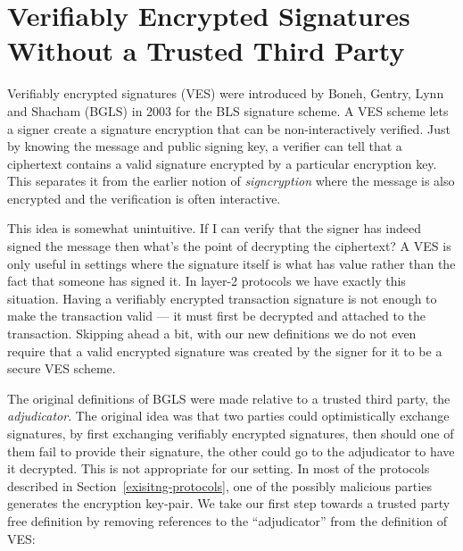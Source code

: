 \section{Verifiably Encrypted Signatures Without a Trusted Third Party}
\label{VES-section}

Verifiably encrypted signatures (VES) were introduced by Boneh, Gentry, Lynn and Shacham (BGLS) \cite{Boneh:2003:AVE:1766171.1766207} in 2003 for the BLS signature scheme\cite{Boneh:2001:SSW:647097.717005}. A VES scheme lets a signer create a signature encryption that can be non-interactively verified. Just by knowing the message and public signing key, a verifier can tell that a ciphertext contains a valid signature encrypted by a particular encryption key. This separates it from the earlier notion of \emph{signcryption}\cite{signcryption-book} where the message is also encrypted and the verification is often interactive.

This idea is somewhat unintuitive. If I can verify that the signer has indeed signed the message then what's the point of decrypting the ciphertext? A VES is only useful in settings where the signature itself is what has value rather than the fact that someone has signed it. In layer-2 protocols we have exactly this situation. Having a verifiably encrypted transaction signature is not enough to make the transaction valid --- it must first be decrypted and attached to the transaction. Skipping ahead a bit, with our new definitions we do not even require that a valid encrypted signature was created by the signer for it to be a secure VES scheme.

The original definitions of BGLS were made relative to a trusted third party, the \emph{adjudicator}. The original idea was that two parties could optimistically exchange signatures, by first exchanging verifiably encrypted signatures, then should one of them fail to provide their signature, the other could go to the adjudicator to have it decrypted. This is not appropriate for our setting. In most of the protocols described in Section~\ref{exisitng-protocols}, one of the possibly malicious parties generates the encryption key-pair. We take our first step towards a trusted party free definition by removing references to the ``adjudicator'' from the definition of VES:


